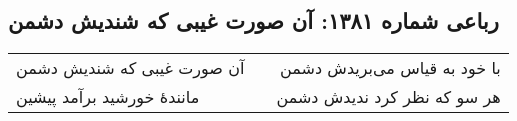\begin{center}
\section*{رباعی شماره ۱۳۸۱: آن صورت غیبی که شندیش دشمن}
\label{sec:1381}
\begin{longtable}{l p{0.5cm} r}
آن صورت غیبی که شندیش دشمن
&&
با خود به قیاس می‌بریدش دشمن
\\
مانندهٔ خورشید برآمد پیشین
&&
هر سو که نظر کرد ندیدش دشمن
\\
\end{longtable}
\end{center}
